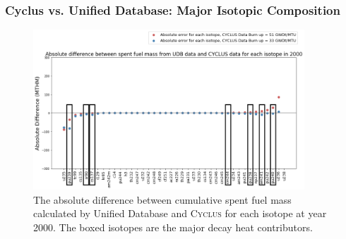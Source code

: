 \begin{frame}
    \frametitle{Cyclus vs. Unified Database: Major Isotopic Composition}
    \begin{figure}[htbp!]
        \begin{center}
          \includegraphics[height=6cm]{../figures/absolute_diff_2000_annotated}
        \end{center}
              \caption{The absolute difference between cumulative spent fuel mass calculated by 
              Unified Database and \textsc{Cyclus} for each isotope at year 2000. The boxed isotopes are the major decay heat contributors.}
        \label{fig:totalmass}
      \end{figure}
\end{frame}